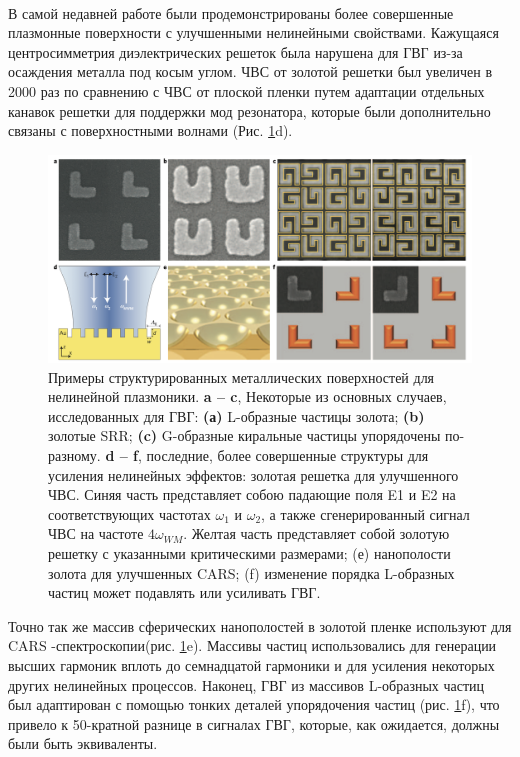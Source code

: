 \\
\hspace*{2mm}
В самой недавней работе были продемонстрированы более совершенные плазмонные поверхности с улучшенными нелинейными свойствами. Кажущаяся центросимметрия диэлектрических решеток была нарушена для ГВГ из-за осаждения металла под косым углом. ЧВС от золотой решетки был увеличен в 2000 раз по сравнению с ЧВС от плоской пленки путем адаптации отдельных канавок решетки для поддержки мод резонатора, которые были дополнительно связаны с поверхностными волнами \cite{genevet2010large} (Рис. \ref{mettals}d). 
\begin{figure}[h!]
	\centering
	\includegraphics[width=0.9\linewidth]{images/mettals.png}
	\caption{Примеры структурированных металлических поверхностей для нелинейной плазмоники. \textbf{a – c}, Некоторые из основных случаев, исследованных для ГВГ: \textbf{(а)} L-образные частицы золота; \textbf{(b) }золотые SRR; \textbf{(c)} G-образные киральные частицы упорядочены по-разному. \textbf{d – f},  последние, более совершенные структуры для усиления нелинейных эффектов: золотая решетка для улучшенного ЧВС. Синяя часть представляет собою падающие поля E1 и E2 на соответствующих частотах $\omega_1$ и $\omega_2$, а также сгенерированный сигнал ЧВС на частоте $4\omega_{WM}$. Желтая часть представляет собой золотую решетку с указанными критическими размерами; (е) нанополости золота для улучшенных CARS; (f) изменение порядка L-образных частиц может подавлять или усиливать ГВГ.}
	\label{mettals}
\end{figure}
Точно так же массив сферических нанополостей в золотой пленке используют для CARS -спектроскопии(рис. \ref{mettals}e). Массивы частиц использовались для генерации высших гармоник вплоть до семнадцатой гармоники \cite{kim2008high} и для усиления некоторых других нелинейных процессов. Наконец, ГВГ из массивов L-образных частиц был адаптирован с помощью тонких деталей упорядочения частиц (рис. \ref{mettals}f), что привело к 50-кратной разнице в сигналах ГВГ, которые, как ожидается, должны были быть эквиваленты.

